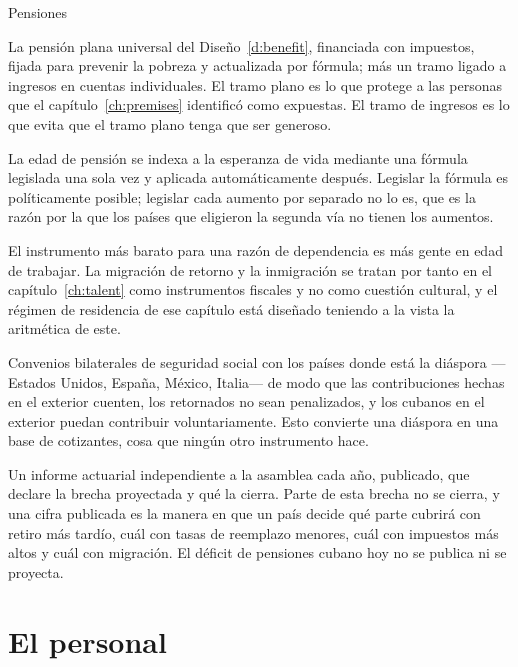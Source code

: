 \begin{design}{Pensiones}
\label{d:pension}
\begin{rules}
 La pensión plana universal del Diseño~\ref{d:benefit}, financiada
con impuestos, fijada para prevenir la pobreza y actualizada por fórmula; más un tramo
ligado a ingresos en cuentas individuales. El tramo plano es lo que protege a las
personas que el capítulo~\ref{ch:premises} identificó como expuestas. El tramo de
ingresos es lo que evita que el tramo plano tenga que ser generoso.

 La edad de pensión se indexa a la esperanza de vida
mediante una fórmula legislada una sola vez y aplicada automáticamente después.
Legislar la fórmula es políticamente posible; legislar cada aumento por separado no lo
es, que es la razón por la que los países que eligieron la segunda vía no tienen los
aumentos.

 El instrumento más barato para una
razón de dependencia es más gente en edad de trabajar. La migración de retorno y la
inmigración se tratan por tanto en el capítulo~\ref{ch:talent} como instrumentos
fiscales y no como cuestión cultural, y el régimen de residencia de ese capítulo está
diseñado teniendo a la vista la aritmética de este.

 Convenios bilaterales de seguridad social con los países donde
está la diáspora ---Estados Unidos, España, México, Italia--- de modo que las
contribuciones hechas en el exterior cuenten, los retornados no sean penalizados, y los
cubanos en el exterior puedan contribuir voluntariamente. Esto convierte una diáspora
en una base de cotizantes, cosa que ningún otro instrumento hace.

 Un informe actuarial independiente a la asamblea cada año,
publicado, que declare la brecha proyectada y qué la cierra. Parte de esta brecha no se
cierra, y una cifra publicada es la manera en que un país decide qué parte cubrirá con
retiro más tardío, cuál con tasas de reemplazo menores, cuál con impuestos más altos y
cuál con migración. El déficit de pensiones cubano hoy no se publica ni se proyecta.
\end{rules}
\end{design}

\section{El personal}

